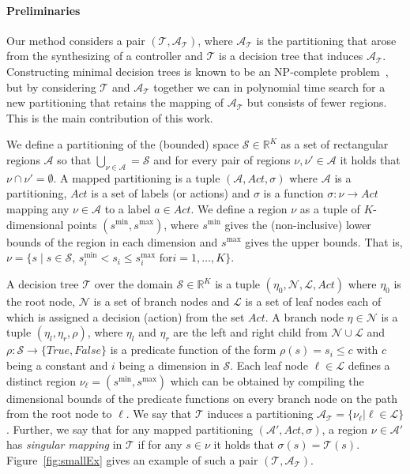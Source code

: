 \documentclass{easychair}
\begin{document}
\paragraph{Preliminaries} Our method considers a pair $(\mathcal{T},
\mathcal{A}_{\mathcal{T}})$, where $\mathcal{A}_{\mathcal{T}}$ is the
partitioning that arose from the synthesizing of a controller and $\mathcal{T}$
is a decision tree that induces $\mathcal{A}_{\mathcal{T}}$. Constructing
minimal decision trees is known to be an NP-complete
problem~\cite{hyafilConstructingOptimalBinary1976}, but by considering
$\mathcal{T}$ and $\mathcal{A}_{\mathcal{T}}$ together we can in polynomial time
search for a new partitioning that retains the mapping of
$\mathcal{A}_{\mathcal{T}}$ but consists of fewer regions. This is the main
contribution of this work.

We define a partitioning of the (bounded) space $\mathcal{S} \in \mathbb{R}^K$
as a set of rectangular regions $\mathcal{A}$ so that $\bigcup_{\nu \in
\mathcal{A}} = \mathcal{S}$ and for every pair of regions $\nu,\nu' \in
\mathcal{A}$ it holds that $\nu \cap \nu' = \emptyset$. A mapped partitioning is
a tuple $(\mathcal{A}, Act, \sigma)$ where $\mathcal{A}$ is a partitioning,
$Act$ is a set of labels (or actions) and $\sigma$ is a function $\sigma : \nu
\rightarrow Act$ mapping any $\nu \in \mathcal{A}$ to a label $a \in Act$. We
define a region $\nu$ as a tuple of $K$-dimensional points $(s^{\min},
s^{\max})$, where $s^{\min}$ gives the (non-inclusive) lower bounds of the
region in each dimension and $s^{\max}$ gives the upper bounds. That is, $\nu =
\{s \mid s \in \mathcal{S}, \, s^{\min}_{i} < s_{i} \leq s^{\max}_{i} \text{ for
} i = 1,\ldots,K \}$.

A decision tree $\mathcal{T}$ over the domain $\mathcal{S} \in \mathbb{R}^K$ is
a tuple $(\eta_{0}, \mathcal{N}, \mathcal{L}, Act)$ where $\eta_0$ is the root
node, $\mathcal{N}$ is a set of branch nodes and $\mathcal{L}$ is a set of leaf
nodes each of which is assigned a decision (action) from the set $Act$. A branch
node $\eta \in \mathcal{N}$ is a tuple $(\eta_{l}, \eta_{r}, \rho)$, where
$\eta_{l}$ and $\eta_{r}$ are the left and right child from $\mathcal{N} \cup
\mathcal{L}$ and $\rho : \mathcal{S} \rightarrow \{True, False\}$ is a predicate
function of the form $\rho(s) = s_i \leq c$ with $c$ being a constant and $i$
being a dimension in $\mathcal{S}$.  Each leaf node $\ell \in \mathcal{L}$
defines a distinct region $\nu_{\ell} = (s^{\min}, s^{\max})$ which can be
obtained by compiling the dimensional bounds of the predicate functions on every
branch node on the path from the root node to $\ell$. We say that $\mathcal{T}$
induces a partitioning $\mathcal{A}_{\mathcal{T}} = \{ \nu_{\ell} | \ell \in
\mathcal{L} \}$. Further, we say that for any mapped partitioning
$(\mathcal{A}', Act, \sigma)$, a region $\nu \in \mathcal{A}'$ has
\textit{singular mapping} in $\mathcal{T}$ if for any $s \in \nu$ it holds that
$\sigma(s) = \mathcal{T}(s)$. Figure~\ref{fig:smallEx} gives an example of such
a pair $(\mathcal{T}, \mathcal{A}_{\mathcal{T}})$.
\end{document}
